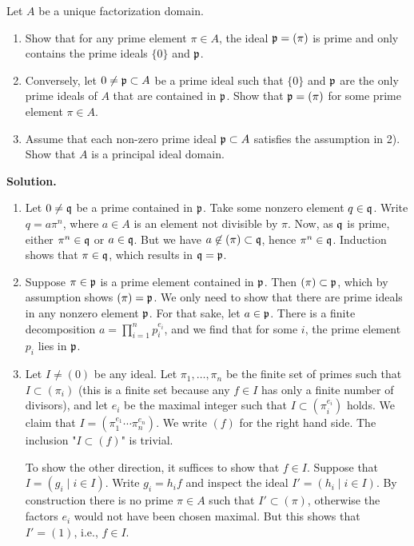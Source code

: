 \documentclass[a4paper,11pt]{article}
\begin{document}
Let $A$ be a unique factorization domain. 
\begin{enumerate}
    \item Show that for any prime element $\pi \in A$, the ideal $\mathfrak{p} = (\pi)$ is 
        prime and only contains the prime ideals $\{0\}$ and $\mathfrak{p}$.
    \item Conversely, let $0 \neq \mathfrak{p} \subset A$ be a prime ideal such that $\{0\}$
        and $\mathfrak{p}$ are the only prime ideals of $A$ that are contained in $\mathfrak{p}$. 
        Show that $\mathfrak{p} = (\pi)$ for some prime element $\pi \in A$. 
    \item Assume that each non-zero prime ideal $\mathfrak{p} \subset A$ satisfies the
        assumption in 2). Show that $A$ is a principal ideal domain. 
\end{enumerate}

\textbf{Solution.}
\begin{enumerate}
    \item Let $0 \neq \mathfrak{q}$ be a prime contained in $\mathfrak{p}$. Take some nonzero
        element $q \in \mathfrak{q}$. Write $q = a \pi^n$, where $a \in A$ is an element
        not divisible by $\pi$. Now, as $\mathfrak{q}$ is prime, either $\pi^n \in \mathfrak{q}$ or 
        $a \in \mathfrak{q}$. But we have $a \not \in (\pi) \subset \mathfrak{q}$, hence
        $\pi^n \in \mathfrak{q}$. Induction shows that $\pi \in \mathfrak{q}$, which results in
        $\mathfrak{q} = \mathfrak{p}$. 

    \item Suppose $\pi \in \mathfrak{p}$ is a prime element contained in $\mathfrak{p}$. Then
        $(\pi) \subset \mathfrak{p}$, which by assumption shows $(\pi) = \mathfrak{p}$. 
        We only need to show that there are prime ideals in any
        nonzero element $\mathfrak{p}$. For that sake, let $a \in \mathfrak{p}$. There is a finite
        decomposition $a = \prod_{i=1}^n p_i^{e_i}$, and we find 
        that for some $i$, the prime element $p_i$ lies in $\mathfrak{p}$. 

    \item Let $I \neq (0)$ be any ideal. Let $\pi_1, \dots, \pi_n$ be the
        finite set of primes such that $I \subset (\pi_i)$ (this is a finite set
        because any $f \in I$ has only a finite number of divisors), and let
        $e_i$ be the maximal integer such that $I \subset (\pi_i^{e_i})$ holds.
        We claim that $I = (\pi_1^{e_1} \cdots \pi_n^{e_n})$. We write $(f)$
        for the right hand side. The inclusion "$I \subset (f)$" is trivial. 

        To show the other direction, it suffices to show that $f \in I$. 
        Suppose that $I = (g_i \mid i \in I)$. Write $g_i = h_i f$ and inspect
        the ideal $I' = (h_i \mid i \in I)$. By construction there is no 
        prime $\pi \in A$ such that $I' \subset (\pi)$, otherwise the
        factors $e_i$ would not have been chosen maximal. But this shows that 
        $I' = (1)$, i.e., $f \in I$. 


\end{enumerate}
\end{document}
